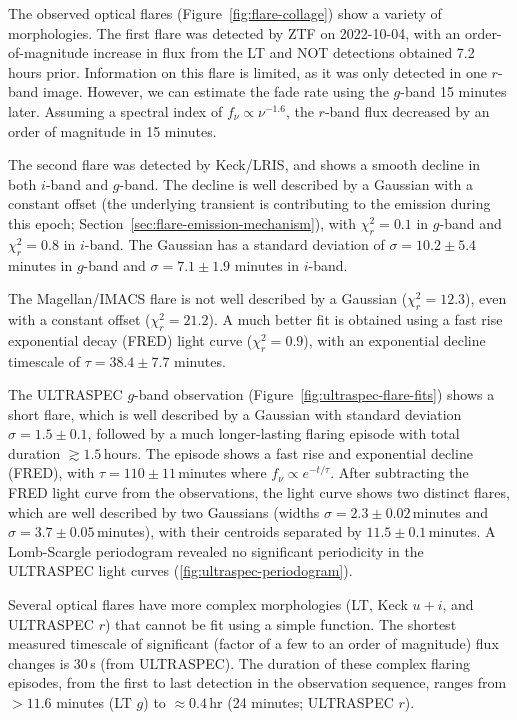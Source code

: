 \documentclass{nature_plusfigure}
\begin{document}
\begin{methods}
The observed optical flares (Figure~\ref{fig:flare-collage}) show a variety of morphologies. The first flare was detected by ZTF on 2022-10-04, with an order-of-magnitude increase in flux from the LT and NOT detections obtained 7.2 hours prior. Information on this flare is limited, as it was only detected in one $r$-band image. However, we can estimate the fade rate using the $g$-band 15 minutes later. Assuming a spectral index of $f_\nu \propto \nu^{-1.6}$, the $r$-band flux decreased by an order of magnitude in 15 minutes.

The second flare was detected by Keck/LRIS, and shows a smooth decline in both $i$-band and $g$-band. The decline is well described by a Gaussian with a constant offset (the underlying transient is contributing to the emission during this epoch; Section~\ref{sec:flare-emission-mechanism}), with $\chi^2_r=0.1$ in $g$-band and $\chi^2_r=0.8$ in $i$-band. The Gaussian has a standard deviation of $\sigma=10.2\pm5.4$ minutes in $g$-band and $\sigma=7.1\pm1.9$ minutes in $i$-band.

The Magellan/IMACS flare is not well described by a Gaussian ($\chi^2_r=12.3$), even with a constant offset ($\chi^2_r=21.2$). A much better fit is obtained using a fast rise exponential decay (FRED) light curve ($\chi^2_r=0.9$), with an exponential decline timescale of $\tau=38.4\pm7.7$ minutes. 

The ULTRASPEC $g$-band observation (Figure~\ref{fig:ultraspec-flare-fits}) shows a short flare, which is well described by a Gaussian with standard deviation $\sigma=1.5\pm0.1$, followed by a much longer-lasting flaring episode with total duration $\gtrsim1.5\,$hours. The episode shows a fast rise and exponential decline (FRED), with $\tau=110\pm11\,$minutes where $f_\nu\propto e^{-t/\tau}$. After subtracting the FRED light curve from the observations, the light curve shows two distinct flares, which are well described by two Gaussians (widths $\sigma=2.3\pm0.02\,$minutes and $\sigma=3.7\pm0.05\,$minutes), with their centroids separated by $11.5\pm0.1$\,minutes. A Lomb-Scargle periodogram\cite{Lomb1976,Scargle1982} revealed no significant periodicity in the ULTRASPEC light curves (\ref{fig:ultraspec-periodogram}).

Several optical flares have more complex morphologies (LT, Keck $u+i$, and ULTRASPEC $r$) that cannot be fit using a simple function. The shortest measured timescale of significant (factor of a few to an order of magnitude) flux changes is 30\,s (from ULTRASPEC). The duration of these complex flaring episodes, from the first to last detection in the observation sequence, ranges from $>11.6$ minutes (LT $g$) to $\approx0.4\,$hr (24 minutes; ULTRASPEC $r$).


\end{methods}
\end{document}
